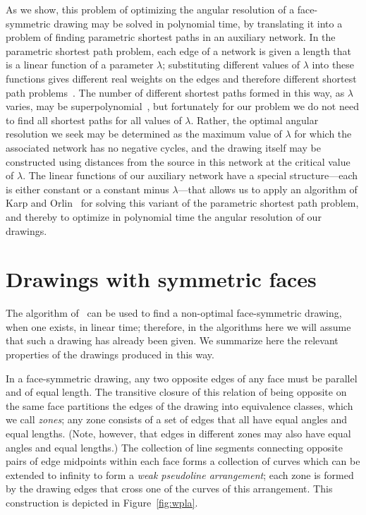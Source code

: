 \documentclass[11pt,letter]{article}
\begin{document}
As we show, this problem of optimizing the angular resolution of a
face-symmetric drawing may be solved in polynomial time, by
translating it into a problem of finding parametric shortest paths in
an auxiliary network. In the parametric shortest path problem, each
edge of a network is given a length that is a linear function of a
parameter $\lambda$; substituting different values of $\lambda$ into
these functions gives different real weights on the edges and
therefore different shortest path problems~\cite{Gus-JACM-83}. The
number of different shortest paths formed in this way, as $\lambda$ varies, may
be superpolynomial~\cite{Car-84}, but fortunately for our problem we
do not need to find all shortest paths for all values of $\lambda$. Rather, the
optimal angular resolution we seek may be determined as the maximum
value of $\lambda$ for which the associated network has no negative
cycles, and the drawing itself may be constructed using distances from
the source in this network at the critical value of $\lambda$. The
linear functions of our auxiliary network have a special
structure---each is either constant or a constant minus
$\lambda$---that allows us to apply an algorithm of Karp and
Orlin~\cite{KarOrl-DAM-81} for solving this variant of the parametric
shortest path problem, and thereby to optimize in polynomial time the
angular resolution of our drawings.

\section{Drawings with symmetric faces}
\label{section:drawings}

The algorithm of~\cite{Epp-GD-04} can be used to find a non-optimal face-symmetric
drawing, when one exists, in linear time; therefore, in the algorithms
here we will assume that such a drawing has already been given. We
summarize here the relevant properties of the drawings produced in
this way.

In a face-symmetric drawing, any two opposite edges of any face must
be parallel and of equal length. The transitive closure of this
relation of being opposite on the same face partitions the edges of
the drawing into equivalence classes, which we call \emph{zones}; any
zone consists of a set of edges that all have equal angles and equal
lengths. (Note, however, that edges in different zones may also have
equal angles and equal lengths.) The collection of line segments
connecting opposite pairs of edge midpoints within each face forms a
collection of curves which can be extended to infinity to form a
\emph{weak pseudoline arrangement}; each zone is formed by the drawing
edges that cross one of the curves of this arrangement. This
construction is depicted in Figure~\ref{fig:wpla}.
\end{document}
